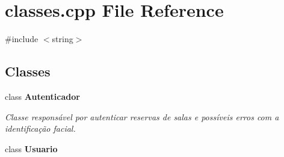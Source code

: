 \section{classes.\+cpp File Reference}
\label{classes_8cpp}
{\ttfamily \#include $<$string$>$}\newline
\subsection*{Classes}
\begin{DoxyCompactItemize}
\item 
class \textbf{ Autenticador}
\begin{DoxyCompactList}\small\item\em Classe responsável por autenticar reservas de salas e possíveis erros com a identificação facial. \end{DoxyCompactList}\item 
class \textbf{ Usuario}
\end{DoxyCompactItemize}
